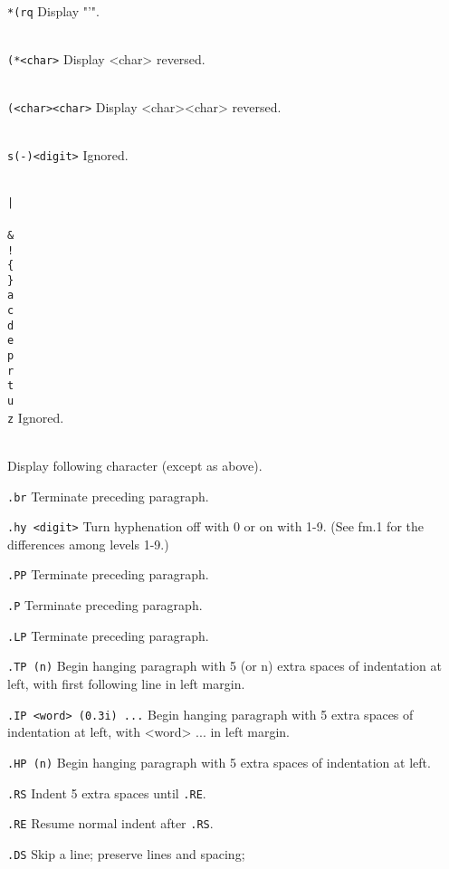 \item{\tt \\*(rq}	Display "'".
\item{\tt \\(*<char>}	Display <char> reversed.
\item{\tt \\(<char><char>}
			Display <char><char> reversed.
\item{\tt \\s(-)<digit>}
			Ignored.
\item{\tt \\| \\\^ \\\& \\! \\\{ \\\} \\a \\c \\d \\e \\p \\r \\t \\u \\z}
			Ignored.
\item{\tt \\}		Display following character (except as above).
\item{\tt .br}		Terminate preceding paragraph.
\item{\tt .hy~<digit>}  Turn hyphenation off with 0 or on with 1-9.
			(See fm.1 for the differences among levels 1-9.)
\item{\tt .PP}		Terminate preceding paragraph.
\item{\tt .P}		Terminate preceding paragraph.
\item{\tt .LP}		Terminate preceding paragraph.
\item{\tt .TP~(n)}	Begin hanging paragraph with 5 (or n) extra
			spaces of indentation at left, with first
			following line in left margin.
\item{\tt .IP~<word>~(0.3i)~...}
			Begin hanging paragraph with 5 extra
			spaces of indentation at left, with <word> ...
			in left margin.
\item{\tt .HP~(n)}	Begin hanging paragraph with 5 extra
			spaces of indentation at left.
\item{\tt .RS}		Indent 5 extra spaces until {\tt .RE}.
\item{\tt .RE}		Resume normal indent after {\tt .RS}.
\item{\tt .DS}		Skip a line; preserve lines and spacing;
